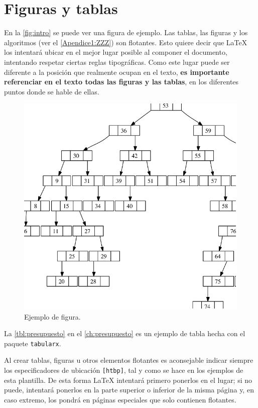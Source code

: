 \section{Figuras y tablas}

\noindent En la \autoref{fig:intro} se puede ver una figura de ejemplo. Las tablas, las figuras y los algoritmos (ver el \autoref{Apendice1:ZZZ}) son flotantes. Esto quiere decir que \LaTeX{} los intentará ubicar en el mejor lugar posible al componer el documento, intentando respetar ciertas reglas tipográficas. Como este lugar puede ser diferente a la posición que realmente ocupan en el texto, \textbf{es importante referenciar en el texto todas las figuras y las tablas}, en los diferentes puntos donde se hable de ellas.

\begin{figure}[htbp]
   \centering
   \includegraphics[width=0.8\linewidth]{images/figura_1}
   \caption{Ejemplo de figura.}
   \label{fig:intro}
\end{figure}

La \autoref{tbl:presupuesto} en el \autoref{ch:presupuesto} es un ejemplo de tabla hecha con el paquete \texttt{tabularx}.

Al crear tablas, figuras u otros elementos flotantes es aconsejable indicar siempre los especificadores de ubicación \texttt{[htbp]}, tal y como se hace en los ejemplos de esta plantilla. De esta forma \LaTeX{} intentará primero ponerlos en el lugar; si no puede, intentará ponerlos en la parte superior o inferior de la misma página y, en caso extremo, los pondrá en páginas especiales que solo contienen flotantes.

